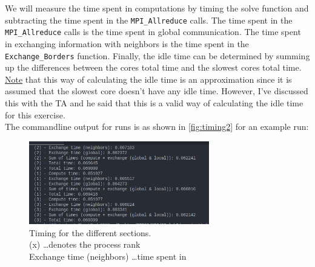 We will measure the time spent in computations by timing the solve function and subtracting the time spent in the \texttt{MPI\_Allreduce} calls. The time spent in the \texttt{MPI\_Allreduce} calls is the time spent in global communication. The time spent in exchanging information with neighbors is the time spent in the \texttt{Exchange\_Borders} function. Finally, the idle time can be determined by summing up the differences between the cores total time and the slowest cores total time. \underline{Note} that this way of calculating the idle time is an approximation since it is assumed that the slowest core doesn't have any idle time. However, I've discussed this with the TA and he said that this is a valid way of calculating the idle time for this exercise.\\
The commandline output for runs is as shown in \autoref{fig:timing2} for an example run: 
\begin{figure}[H]
    \centering
    \includegraphics[width=0.7\textwidth]{../fig/lab2/ex2.png}
    \caption{Timing for the different sections.\\
    (x) \dots denotes the process rank\\
    Exchange time (neighbors) \dots time spent in \texttt{} }
    \label{fig:timing2}
\end{figure}

